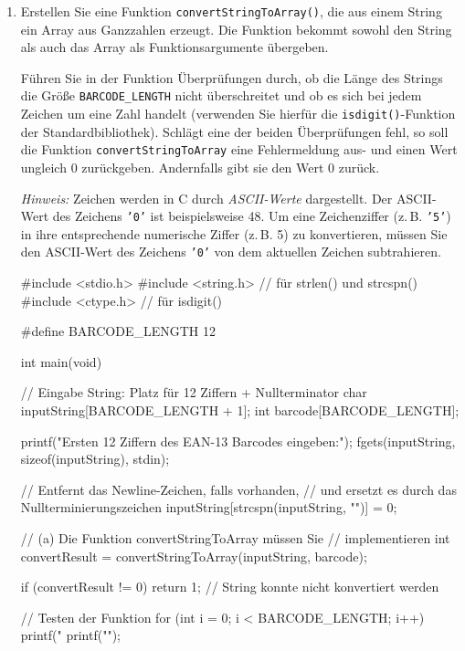 \begin{enumerate}

\item Erstellen Sie eine Funktion \texttt{convertStringToArray()}, die
aus einem String ein Array aus Ganzzahlen erzeugt. Die Funktion bekommt sowohl
den String als auch das Array als Funktionsargumente übergeben.

Führen Sie in der Funktion Überprüfungen durch, ob die Länge des Strings die
Größe \texttt{BARCODE_LENGTH} nicht überschreitet und ob es sich bei
jedem Zeichen um eine Zahl handelt (verwenden Sie hierfür die
\texttt{isdigit()}-Funktion der Standardbibliothek). Schlägt eine der
beiden Überprüfungen fehl, so soll die Funktion
\texttt{convertStringToArray} eine Fehlermeldung aus- und einen Wert
ungleich 0 zurückgeben. Andernfalls gibt sie den Wert 0 zurück.

\textit{Hinweis:} Zeichen werden in C durch \textit{ASCII-Werte} dargestellt.
Der ASCII-Wert des Zeichens \texttt{'0'} ist beispielsweise 48. Um eine
Zeichenziffer (z.\,B. \texttt{'5'}) in ihre entsprechende numerische Ziffer
(z.\,B. 5) zu konvertieren, müssen Sie den ASCII-Wert des Zeichens \texttt{'0'}
von dem aktuellen Zeichen subtrahieren.

\pagebreak

\Vorlage
\begin{codebox}[lang=c, fontsize=\small]
#include <stdio.h>
#include <string.h> // für strlen() und strcspn()
#include <ctype.h>  // für isdigit()

#define BARCODE_LENGTH 12

int main(void) {
    // Eingabe String: Platz für 12 Ziffern + Nullterminator
    char inputString[BARCODE_LENGTH + 1];
    int barcode[BARCODE_LENGTH];

    printf("Ersten 12 Ziffern des EAN-13 Barcodes eingeben:\n");
    fgets(inputString, sizeof(inputString), stdin);

    // Entfernt das Newline-Zeichen, falls vorhanden,
    // und ersetzt es durch das Nullterminierungszeichen
    inputString[strcspn(inputString, "\n")] = 0;


    // (a) Die Funktion convertStringToArray müssen Sie
    //     implementieren
    int convertResult = convertStringToArray(inputString, barcode);

    if (convertResult != 0)
        return 1; // String konnte nicht konvertiert werden

    // Testen der Funktion
    for (int i = 0; i < BARCODE_LENGTH; i++)
        printf("%
    printf("\n");

}
\end{codebox}
\end{enumerate}

